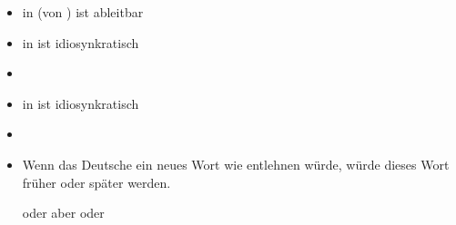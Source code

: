 
\begin{frame}

\begin{itemize}
	\item \textipa{[t]} in  (von ) ist ableitbar
	\item {} in  ist idiosynkratisch
	\item[]
	\item {} in  ist idiosynkratisch
	\item[]
	\item Wenn das Deutsche ein neues Wort wie  \textipa{[k @ U d]} entlehnen würde, würde dieses Wort früher oder später  werden.
	
	\ea \textipa{[k O U t]} oder \textipa{[k o: t]} aber  oder  
	\z
	
\end{itemize}

\end{frame}



%
%

